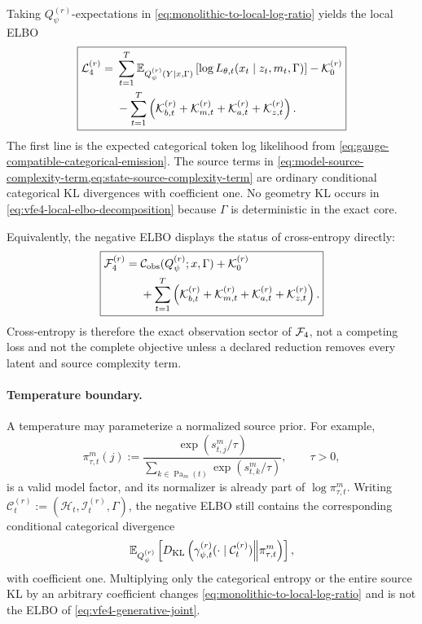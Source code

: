 Taking $Q_\psi^{(r)}$-expectations in \cref{eq:monolithic-to-local-log-ratio} yields the local ELBO
\begin{equation}
\boxed{
\begin{aligned}
\mathcal L_4^{(r)}
={}&\sum_{t=1}^{T}
\mathbb E_{Q_\psi^{(r)}(Y\mid x,\Gamma)}
\left[
\log L_{\theta,t}(x_t\mid z_t,m_t,\Gamma)
\right]
-\mathcal K_0^{(r)}\\
&-\sum_{t=1}^{T}
\left(
\mathcal K_{b,t}^{(r)}
+\mathcal K_{m,t}^{(r)}
+\mathcal K_{a,t}^{(r)}
+\mathcal K_{z,t}^{(r)}
\right).
\end{aligned}}
\label{eq:vfe4-local-elbo-decomposition}
\end{equation}
The first line is the expected categorical token log likelihood from \cref{eq:gauge-compatible-categorical-emission}. The source terms in \cref{eq:model-source-complexity-term,eq:state-source-complexity-term} are ordinary conditional categorical KL divergences with coefficient one. No geometry KL occurs in \cref{eq:vfe4-local-elbo-decomposition} because $\Gamma$ is deterministic in the exact core.

Equivalently, the negative ELBO displays the status of cross-entropy directly:
\begin{equation}
\boxed{
\begin{aligned}
\mathcal F_4^{(r)}
={}&\mathcal C_{\mathrm{obs}}(Q_\psi^{(r)};x,\Gamma)
+\mathcal K_0^{(r)}\\
&+\sum_{t=1}^{T}
\left(
\mathcal K_{b,t}^{(r)}
+\mathcal K_{m,t}^{(r)}
+\mathcal K_{a,t}^{(r)}
+\mathcal K_{z,t}^{(r)}
\right).
\end{aligned}}
\label{eq:vfe4-negative-elbo-ce-plus-complexity}
\end{equation}
Cross-entropy is therefore the exact observation sector of $\mathcal F_4$, not a competing loss and not the complete objective unless a declared reduction removes every latent and source complexity term.

\paragraph{Temperature boundary.}
A temperature may parameterize a normalized source prior. For example,
\begin{equation}
\pi_{\tau,t}^{m}(j)
:=\frac{\exp(s_{t,j}^{m}/\tau)}
{\sum_{k\in\operatorname{Pa}_m(t)}\exp(s_{t,k}^{m}/\tau)},
\qquad \tau>0,
\label{eq:temperature-parameterized-source-prior}
\end{equation}
is a valid model factor, and its normalizer is already part of $\log\pi_{\tau,t}^{m}$. Writing
$\mathcal C_t^{(r)}:=(\mathcal H_t,\mathcal I_t^{(r)},\Gamma)$,
the negative ELBO still contains the corresponding conditional categorical divergence
\[
\mathbb E_{Q_\psi^{(r)}}\left[
D_{\mathrm{KL}}\left(
\gamma_{\psi,t}^{(r)}(\mathord{\cdot}\mid\mathcal C_t^{(r)})
\middle\Vert
\pi_{\tau,t}^{m}
\right)
\right],
\]
with coefficient one. Multiplying only the categorical entropy or the entire source KL by an arbitrary coefficient changes \cref{eq:monolithic-to-local-log-ratio} and is not the ELBO of \cref{eq:vfe4-generative-joint}.

